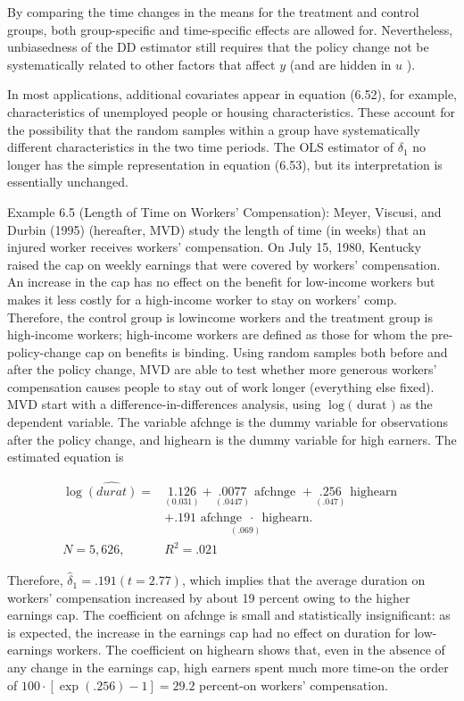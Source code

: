 \documentclass[10pt]{article}
\begin{document}
By comparing the time changes in the means for the treatment and control groups, both group-specific and time-specific effects are allowed for. Nevertheless, unbiasedness of the DD estimator still requires that the policy change not be systematically related to other factors that affect $y$ (and are hidden in $u$ ).

In most applications, additional covariates appear in equation (6.52), for example, characteristics of unemployed people or housing characteristics. These account for the possibility that the random samples within a group have systematically different characteristics in the two time periods. The OLS estimator of $\delta_{1}$ no longer has the simple representation in equation (6.53), but its interpretation is essentially unchanged.

Example 6.5 (Length of Time on Workers' Compensation): Meyer, Viscusi, and Durbin (1995) (hereafter, MVD) study the length of time (in weeks) that an injured worker receives workers' compensation. On July 15, 1980, Kentucky raised the cap on weekly earnings that were covered by workers' compensation. An increase in the cap has no effect on the benefit for low-income workers but makes it less costly for a high-income worker to stay on workers' comp. Therefore, the control group is lowincome workers and the treatment group is high-income workers; high-income workers are defined as those for whom the pre-policy-change cap on benefits is binding. Using random samples both before and after the policy change, MVD are able to test whether more generous workers' compensation causes people to stay out of work longer (everything else fixed). MVD start with a difference-in-differences analysis, using $\log ($ durat $)$ as the dependent variable. The variable afchnge is the dummy variable for observations after the policy change, and highearn is the dummy variable for high earners. The estimated equation is


\begin{align*}
\log \widehat{(d u r a t)}= & \underset{(0.031)}{1.126}+\underset{(.0447)}{.0077} \text { afchnge }+\underset{(.047)}{.256} \text { highearn } \\
& +\underset{(.069)}{.191 \text { afchnge } \text { ⋅ } \text { highearn. }} \\
N=5,626, \quad & R^{2}=.021 \tag{6.54}
\end{align*}


Therefore, $\hat{\delta}_{1}=.191(t=2.77)$, which implies that the average duration on workers' compensation increased by about 19 percent owing to the higher earnings cap. The coefficient on afchnge is small and statistically insignificant: as is expected, the increase in the earnings cap had no effect on duration for low-earnings workers. The coefficient on highearn shows that, even in the absence of any change in the earnings cap, high earners spent much more time-on the order of $100 \cdot[\exp (.256)-1]=29.2$ percent-on workers' compensation.
\end{document}
